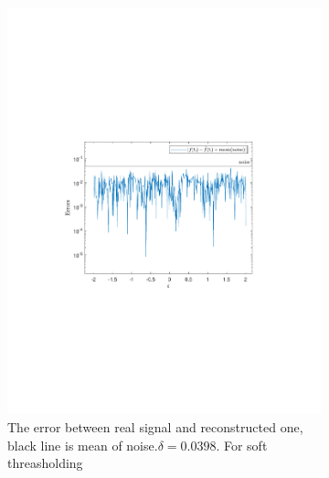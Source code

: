\documentclass[a4paper]{article}
\begin{document}
\begin{figure}[H]
\begin{subfigure}{0.49\textwidth}
\includegraphics[trim={3.5cm 8cm 4cm 9cm},clip,width=1\textwidth]{Images/DeltaOptiSoft.pdf}
\caption{The error between real signal and reconstructed one, black line is mean of noise.$\delta = 0.0398$. For soft threasholding}
\label{sub:BestDeltaSoft}
\end{subfigure}
	\begin{subfigure}{0.49\textwidth}
	\centering

\end{subfigure}
\end{figure}
\end{document}
